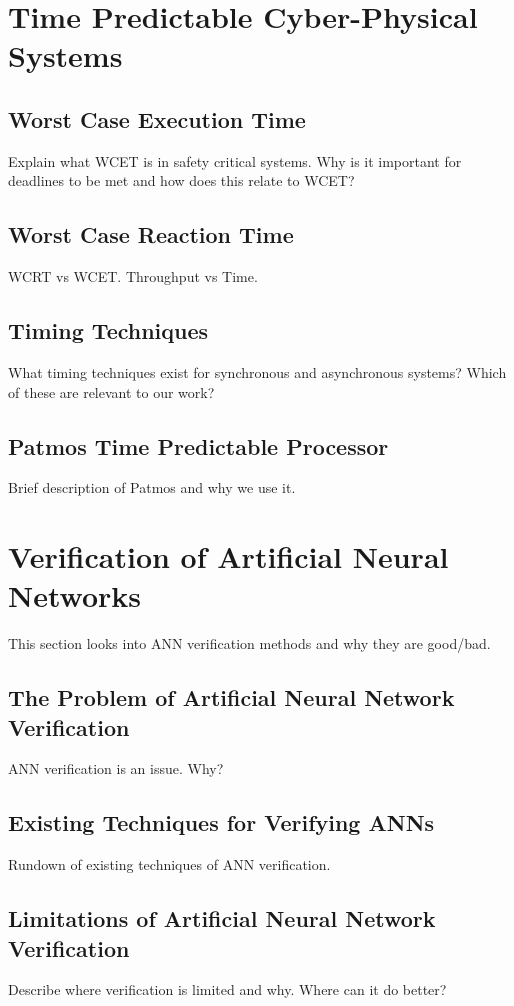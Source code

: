\section{Time Predictable Cyber-Physical Systems}
\subsection{Worst Case Execution Time}
Explain what WCET is in safety critical systems. Why is it important for deadlines to be met and how does this relate to WCET?

\subsection{Worst Case Reaction Time}
WCRT vs WCET. Throughput vs Time.

\subsection{Timing Techniques}
What timing techniques exist for synchronous and asynchronous systems? Which of these are relevant to our work?

\subsection{Patmos Time Predictable Processor}
Brief description of Patmos and why we use it.


\section{Verification of Artificial Neural Networks}
This section looks into ANN verification methods and why they are good/bad.

\subsection{The Problem of Artificial Neural Network Verification}
ANN verification is an issue. Why?

\subsection{Existing Techniques for Verifying ANNs}
Rundown of existing techniques of ANN verification.

\subsection{Limitations of Artificial Neural Network Verification}
Describe where verification is limited and why.
Where can it do better?


